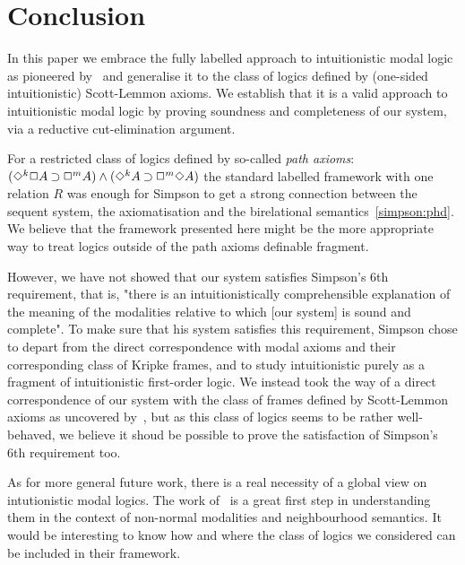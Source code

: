 \section{Conclusion}

In this paper we embrace the fully labelled approach to intuitionistic modal logic as pioneered by~\cite{maffezioli:etal:synthese13} and generalise it to the class of logics defined by (one-sided intuitionistic) Scott-Lemmon axioms.
%
We establish that it is a valid approach to intuitionistic modal logic by proving soundness and completeness of our system, via a reductive cut-elimination argument.

For a restricted class of logics defined by so-called \emph{path axioms}: $(\mathord{\Diamond}^k\mathord{\Box} A \mathbin{\supset}\mathord{\Box}^m A) \mathbin{\wedge} (\mathord{\Diamond}^k A \mathbin{\supset} \mathord{\Box}^m\mathord{\Diamond} A)$ the standard labelled framework with one relation $R$ was enough for Simpson to get a strong connection between the sequent system, the axiomatisation and the birelational semantics~\ref{simpson:phd}.
%
%
We believe that the framework presented here might be the more appropriate way to treat logics outside of the path axioms definable fragment.

However, we have not showed that our system satisfies Simpson's 6th requirement, that is, "there is an intuitionistically comprehensible explanation of the meaning of the modalities relative to which [our system] is sound and complete".
%
To make sure that his system satisfies this requirement, Simpson chose to depart from the direct correspondence with modal axioms and their corresponding class of Kripke frames, and to study intuitionistic purely as a fragment of intuitionistic first-order logic.
%
We instead took the way of a direct correspondence of our system with the class of frames defined by Scott-Lemmon axioms as uncovered by~\cite{plotkin:stirling:86}, but as this class of logics seems to be rather well-behaved, we believe it shoud be possible to prove the satisfaction of Simpson's 6th requirement too.

As for more general future work, there is a real necessity of a global view on intutionistic modal logics.
%
The work of~\cite{dalmonte:grellois:olivetti:arxiv19} is a great first step in understanding them in the context of non-normal modalities and neighbourhood semantics.
%
It would be interesting to know how and where the class of logics we considered can be included in their framework.